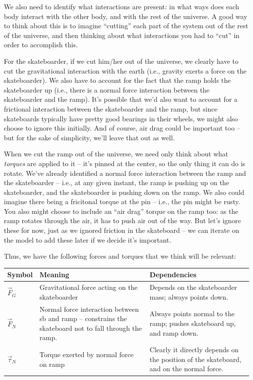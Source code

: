 \documentclass{tufte-handout}
\begin{document}
We also need to identify what interactions are present:  in what ways does each body interact with the other body, and with the rest of the universe.  A good way to think about this is to imagine ``cutting'' each part of the system out of the rest of the universe, and then thinking about what interactions you had to ``cut'' in order to accomplish this.

For the skateboarder, if we cut him/her out of the universe, we clearly have to cut the gravitational interaction with the earth (i.e., gravity exerts a force on the skateboarder).  We also have to account for the fact that the ramp holds the skateboarder up (i.e., there is a normal force interaction between the skateboarder and the ramp).  It's possible that we'd also want to account for a frictional interaction between the skateboarder and the ramp, but since skateboards typically have pretty good bearings in their wheels, we might also choose to ignore this initially.  And of course, air drag could be important too -- but for the sake of simplicity, we'll leave that out as well.

When we cut the ramp out of the universe, we need only think about what {\it torques} are applied to it -- it's pinned at the center, so the only thing it can do is rotate.  We've already identified a normal force interaction between the ramp and the skateboarder -- i.e., at any given instant, the ramp is pushing up on the skateboarder, and the skateboarder is pushing down on the ramp.  We also could imagine there being a fricitonal torque at the pin -- i.e., the pin might be rusty.  You also might choose to include an ``air drag'' torque on the ramp too: as the ramp rotates through the air, it has to push air out of the way.  But let's ignore these for now, just as we ignored friction in the skateboard -- we can iterate on the model to add these later if we decide it's important.

Thus, we have the following forces and torques that we think will be relevant:

\begin{center}
\begin{tabular}{ p{3cm} | p{5cm} | p{5cm}}
Symbol & Meaning & Dependencies \\
\hline
\hline
$\vec{F}_G$ & Gravitational force acting on the skateboarder & Depends on the skateboarder mass; always points down.\\
\hline
$\vec{F}_N$ & Normal force interaction between sb and ramp -- constrains the skateboard not to fall through the ramp. & Always points normal to the ramp; pushes skateboard up, and ramp down.\\ 
\hline
$\vec{\tau}_N$& Torque exerted by normal force on ramp &  Clearly it directly depends on the position of the skateboard, and on the normal force. \\

\end{tabular}
\end{center}
\end{document}
